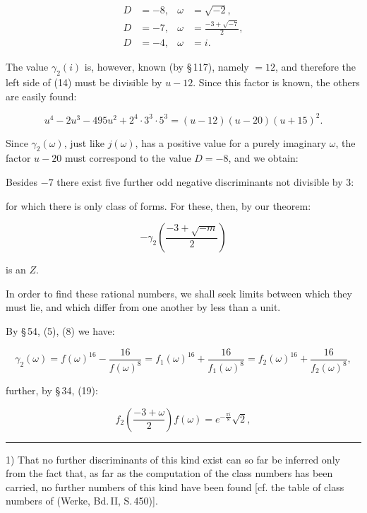 
\[
\begin{aligned}
D &= -8, & \omega &= \sqrt{-2}, \\
D &= -7, & \omega &= \frac{-3+\sqrt{-7}}{2}, \\
D &= -4, & \omega &= i.
\end{aligned}
\]

The value $\gamma_2(i)$ is, however, known (by \S\,117), namely
$=12$, and therefore the left side of (14) must be divisible by
$u-12$. Since this factor is known, the others are easily found:

\[
u^4-2u^3-495u^2+2^4\cdot 3^3\cdot 5^3 = (u-12)(u-20)(u+15)^2.
\]

Since $\gamma_2(\omega)$, just like $j(\omega)$, has a positive
value for a purely imaginary $\omega$, the factor $u-20$ must
correspond to the value $D = -8$, and we obtain:




Besides $-7$ there exist five further odd negative discriminants
not divisible by 3:


for which there is only  class of forms. For these, then, by
our theorem:

\[
-\gamma_2\left(\frac{-3+\sqrt{-m}}{2}\right)
\]

is an  $Z$.

In order to find these rational numbers, we shall seek limits
between which they must lie, and which differ from one another by
less than a unit.

By \S\,54, (5), (8) we have:

\[
\gamma_2(\omega) = f(\omega)^{16}-\frac{16}{f(\omega)^8} = f_1(\omega)^{16}+\frac{16}{f_1(\omega)^8} = f_2(\omega)^{16}+\frac{16}{f_2(\omega)^8},
\]

further, by \S\,34, (19):

\[
f_2\left(\frac{-3+\omega}{2}\right) f(\omega) = e^{-\frac{\pi i}{8}}\sqrt{2},
\]

\bigskip
\noindent\rule{4cm}{0.4pt}

\footnotesize
1) That no further discriminants of this kind exist can so far be
inferred only from the fact that, as far as the computation of the
class numbers has been carried, no further numbers of this kind
have been found [cf. the table of class numbers of
 (Werke, Bd.\,II, S.\,450)].
\normalsize

